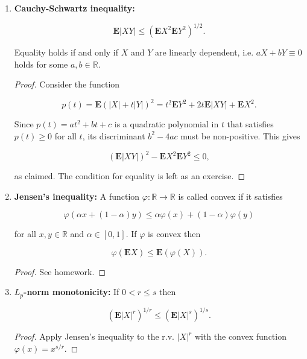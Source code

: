 \documentclass[11pt]{report}
\newcommand{\R}{\mathbb{R}}
\theoremstyle{plain}
\theoremstyle{definition}
\begin{document}
\begin{enumerate}[label=\arabic*.]
\[
\mathrm{P} ( | X-\mathbf{E} X| \ge t) \le \frac{\mathbf{V}(X)}{t^2}.
\]

\begin{proof}
Apply Markov's inequality to $Y=(X-\mathbf{E} X)^2$.
\end{proof}

\item \textbf{Cauchy-Schwartz inequality:}

\[
\mathbf{E}|XY| \le \left(\mathbf{E} X^2 \mathbf{E} Y^2\right)^{1/2}.
\]

Equality holds if and only if $X$ and $Y$ are
linearly dependent, i.e. $aX+bY\equiv 0$ holds for
some $a,b\in \R$.

\begin{proof}
Consider the function

\[
p(t) = \mathbf{E}(|X| + t |Y|)^2 = t^2 \mathbf{E} Y^2 + 2t \mathbf{E}|XY| + \mathbf{E} X^2.
\]

Since $p(t)=at^2+bt+c$ is a quadratic polynomial in
$t$ that satisfies $p(t)\ge 0$ for all $t$, its
discriminant $b^2-4ac$ must be non-positive. This
gives

\[
(\mathbf{E}|XY|)^2 - \mathbf{E} X^2 \mathbf{E} Y^2 \le 0,
\]

as claimed. The condition for equality is left as an
exercise.
\end{proof}

\item \textbf{Jensen's inequality:} A function $\varphi:\R\to\R$
is called convex if it satisfies

\[
\varphi(\alpha x + (1-\alpha)y) \le \alpha \varphi(x)+(1-\alpha)\varphi(y)
\]

for all $x,y\in\R$ and $\alpha\in [0,1]$. If
$\varphi$ is convex then

\[
\varphi(\mathbf{E} X) \le \mathbf{E} (\varphi(X)).
\]

\begin{proof}
See homework.
\end{proof}

\item \textbf{$L_p$-norm monotonicity:} If $0<r\le s$ then

\begin{equation*} \tag{16}\label{eq:lpnormmono}
(\mathbf{E}|X|^r)^{1/r} \le (\mathbf{E} |X|^s)^{1/s}.
\end{equation*}

\begin{proof}
Apply Jensen's inequality to the r.v. $|X|^r$ with
the convex function $\varphi(x) = x^{s/r}$.
\end{proof}
\end{enumerate}
\end{document}
